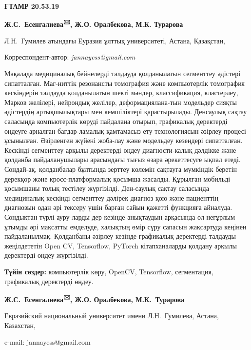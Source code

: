 
\newpage
{\bfseries ҒТАМР 20.53.19}


\begin{center}
 
{\bfseries Ж.С.~Есенгалиева\textsuperscript{🖂}, Ж.О. Оралбекова, М.К.
Турарова}

Л.Н.~Гумилев атындағы Еуразия ұлттық университеті, Астана, Қазақстан,
\end{center}
Корреспондент-автор: \emph{jannayess@gmail.com} \vspace{0.5cm}

Мақалада медициналық бейнелерді талдауда қолданылатын сегменттеу
әдістері сипатталған. Маг-ниттік резонансты томография және компьютерлік
томография кескіндерін талдауда қолданылатын шекті мәндер,
классификация, кластерлеу, Марков желілері, нейрондық желілер,
деформациялана-тын модельдер сияқты әдістердің артықшылықтары мен
кемшіліктері қарастырылады. Денсаулық сақтау саласында компьютерлік
көруді пайдалана отырып, графикалық деректерді өңдеуге арналған
бағдар-ламалық қамтамасыз ету технологиясын әзірлеу процесі ұсынылған.
Әзірленген жүйені жоба-лау және модельдеу кезеңдері сипатталған. Кескінді
сегменттеу арқылы деректерді өңдеу диагности-калық дәлдікке және қолданба
пайдаланушылары арасындағы тығыз өзара әрекеттесуге ықпал етеді.
Сондай-ақ, қолданбалар бұлтында зерттеу көлемін сақтауға мүмкіндік
беретін дерекқор және кросс-платформалық қосымша жасалды. Құрылған
мобильді қосымшаны толық тестілеу жүргізілді. Ден-саулық сақтау саласында
медициналық кескінді сегменттеу дәлірек диагноз қою және пациенттің
диагнозын одан әрі тексеру үшін барған сайын қажетті функцияға айналуда.
Сондықтан түрлі ауру-ларды дер кезінде анықтаудың арқасында ол неғұрлым
ұтымды әрі мақсатты емделуде, халықтың өмір сүру сапасын жақсартуда
кеңінен пайдаланылмақ. Қолданбаны әзірлеу кезінде графикалық деректерді
талдауды жеңілдететін Open CV, Tensorflow, PyTorch кітапханаларды
қолдану арқылы деректерді өңдеу жүргізілді.

{\bfseries Түйін сөздер:} компьютерлік көру, OpenCV, Tensorflow,
сегментация, графикалық деректерді өңдеу.


\begin{center}


{\bfseries Ж.С.~Есенгалиева\textsuperscript{🖂}, Ж.О. Оралбекова,
М.К.~Турарова}

Евразийский национальный университет имени Л.Н.~Гумилева, Астана,
Казахстан,

e-mail: jannayess@gmail.com
\end{center}

